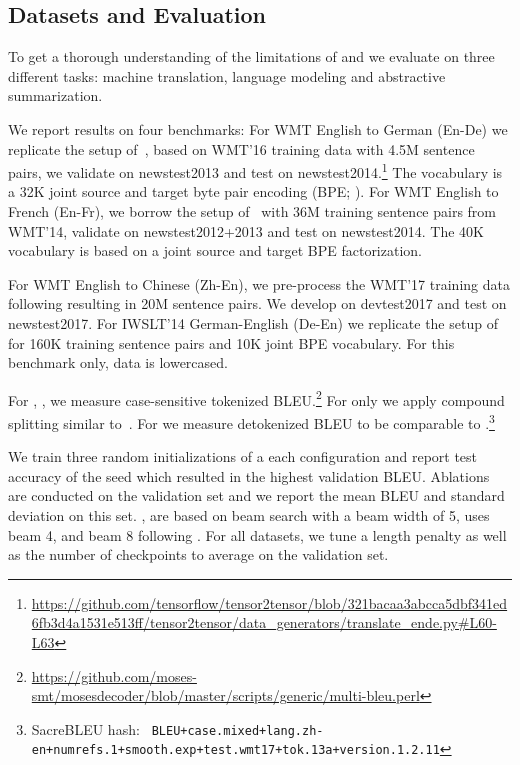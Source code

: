 \subsection{Datasets and Evaluation}\label{sec:datasets}

To get a thorough understanding of the limitations of \sdconv{} and \tvsdconv{} we evaluate on three different tasks: machine translation, language modeling and abstractive summarization.

We report results on four benchmarks: 
For WMT English to German (En-De) we replicate the setup of~\citet{vaswani2017transformer}, based on WMT'16 training data with 4.5M sentence pairs, we validate on newstest2013 and test on newstest2014.\footnote{\scriptsize \url{https://github.com/tensorflow/tensor2tensor/blob/321bacaa3abcca5dbf341ed6fb3d4a1531e513ff/tensor2tensor/data_generators/translate_ende.py\#L60-L63}}
The vocabulary is a 32K joint source and target byte pair encoding (BPE; \citealt{sennrich2016bpe}).
For WMT English to French (En-Fr), we borrow the setup of~\citet{gehring2017convs2s} with 36M training sentence pairs from WMT'14, validate on newstest2012+2013 and test on newstest2014.
The 40K vocabulary is based on a joint source and target BPE factorization.

For WMT English to Chinese (Zh-En), we pre-process the WMT'17 training data following \citet{hassan2018parity} resulting in 20M sentence pairs. 
We develop on devtest2017 and test on newstest2017. 
For IWSLT'14 German-English (De-En) we replicate the setup of \citet{edunov2018classical} for 160K training sentence pairs and 10K joint BPE vocabulary.
For this benchmark only, data is lowercased.

For \ende{}, \enfr{}, we measure case-sensitive tokenized BLEU.\footnote{\scriptsize{\url{https://github.com/moses-smt/mosesdecoder/blob/master/scripts/generic/multi-bleu.perl}}}
For \ende{} only we apply compound splitting similar to~\citet{vaswani2017transformer}.
For \zhen{} we measure detokenized BLEU to be comparable to \citet{hassan2018parity}.\footnote{SacreBLEU hash: \texttt{\scriptsize
BLEU+case.mixed+lang.zh-en+numrefs.1+smooth.exp+test.wmt17+tok.13a+version.1.2.11}}

We train three random initializations of a each configuration and report test accuracy of the seed which resulted in the highest validation BLEU. 
Ablations are conducted on the validation set and we report the mean BLEU and standard deviation on this set.
\ende{}, \enfr{} are based on beam search with a beam width of 5, \iwslt{} uses beam 4, and \zhen{} beam 8 following \citet{hassan2018parity}.
For all datasets, we tune a length penalty as well as the number of checkpoints to average on the validation set.

